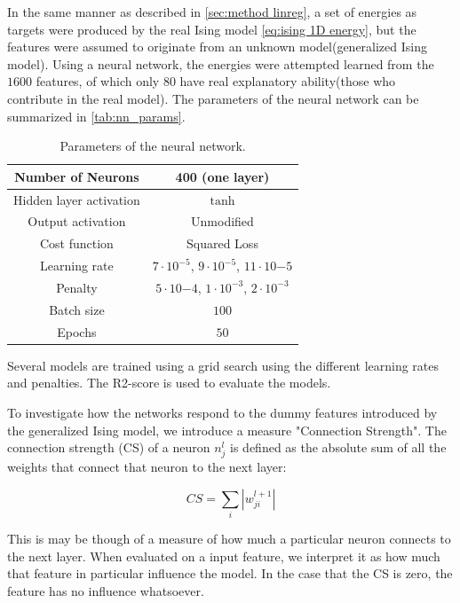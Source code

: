 In the same manner as described in \autoref{sec:method linreg}, a set of energies 
as targets were produced by the real Ising model \autoref{eq:ising 1D energy}, but the features were assumed to originate from an unknown model(generalized Ising model). Using a neural network, the energies were attempted learned from the $1600$ features, of which only $80$ have real explanatory ability(those who contribute in the real model). The parameters of the neural network can be summarized in \autoref{tab:nn_params}.


\begin{table}[H]
\caption{Parameters of the neural network.}
\centering
{}
\begin{tabular}{c|c}
\hline
\hline
Number of Neurons & 400 (one layer)  \\ \hline
Hidden layer activation & $\tanh$   \\ \hline
Output activation & Unmodified  \\ \hline
Cost function & Squared Loss \\ \hline
Learning rate & $7\cdot 10^{-5}$, $9 \cdot 10^{-5}$, $11 \cdot 10{-5}$  \\ \hline
Penalty & $5 \cdot 10{-4}$, $1 \cdot 10^{-3}$, $2 \cdot 10^{-3}$  \\ \hline
Batch size & $100$  \\ \hline
Epochs & $50$  \\ 
\hline
\hline
\end{tabular}
\label{tab:nn_params}
\end{table}

Several models are trained using a grid search using the different learning rates 
and penalties. The R2-score is used to evaluate the models.

To investigate how the networks respond to the dummy features introduced by the generalized Ising model, we introduce a measure "Connection Strength". The connection strength (CS) of a neuron $n^l_j$ is defined as the absolute sum of all the weights that connect that neuron to the next layer:

\begin{equation}\label{eq:CS}
    CS = \sum_i |w^{l+1}_{ji}|
\end{equation}

This is may be though of a measure of how much a particular neuron connects to the next layer. When evaluated on a input feature, we interpret it as how much that feature in particular influence the model. In the case that the CS is zero, the feature has no influence whatsoever.

